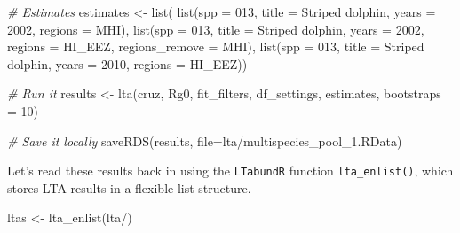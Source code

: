 \documentclass[
]{book}
\newenvironment{Shaded}{\begin{snugshade}}{\end{snugshade}}
\newcommand{\AttributeTok}[1]{\textcolor[rgb]{0.77,0.63,0.00}{#1}}
\newcommand{\CommentTok}[1]{\textcolor[rgb]{0.56,0.35,0.01}{\textit{#1}}}
\newcommand{\DecValTok}[1]{\textcolor[rgb]{0.00,0.00,0.81}{#1}}
\newcommand{\FunctionTok}[1]{\textcolor[rgb]{0.00,0.00,0.00}{#1}}
\newcommand{\NormalTok}[1]{#1}
\newcommand{\OtherTok}[1]{\textcolor[rgb]{0.56,0.35,0.01}{#1}}
\newcommand{\StringTok}[1]{\textcolor[rgb]{0.31,0.60,0.02}{#1}}
\begin{document}
\begin{Shaded}
\begin{Highlighting}[]
\CommentTok{\# Estimates}
\NormalTok{estimates }\OtherTok{\textless{}{-}} \FunctionTok{list}\NormalTok{(}
    \FunctionTok{list}\NormalTok{(}\AttributeTok{spp =} \StringTok{\textquotesingle{}013\textquotesingle{}}\NormalTok{,}
         \AttributeTok{title =} \StringTok{\textquotesingle{}Striped dolphin\textquotesingle{}}\NormalTok{,}
         \AttributeTok{years =} \DecValTok{2002}\NormalTok{,}
         \AttributeTok{regions =} \StringTok{\textquotesingle{}MHI\textquotesingle{}}\NormalTok{),}
    \FunctionTok{list}\NormalTok{(}\AttributeTok{spp =} \StringTok{\textquotesingle{}013\textquotesingle{}}\NormalTok{,}
         \AttributeTok{title =} \StringTok{\textquotesingle{}Striped dolphin\textquotesingle{}}\NormalTok{,}
         \AttributeTok{years =} \DecValTok{2002}\NormalTok{,}
         \AttributeTok{regions =} \StringTok{\textquotesingle{}HI\_EEZ\textquotesingle{}}\NormalTok{,}
         \AttributeTok{regions\_remove =} \StringTok{\textquotesingle{}MHI\textquotesingle{}}\NormalTok{),}
    \FunctionTok{list}\NormalTok{(}\AttributeTok{spp =} \StringTok{\textquotesingle{}013\textquotesingle{}}\NormalTok{,}
         \AttributeTok{title =} \StringTok{\textquotesingle{}Striped dolphin\textquotesingle{}}\NormalTok{,}
         \AttributeTok{years =} \DecValTok{2010}\NormalTok{,}
         \AttributeTok{regions =} \StringTok{\textquotesingle{}HI\_EEZ\textquotesingle{}}\NormalTok{))}

\CommentTok{\# Run it}
\NormalTok{results }\OtherTok{\textless{}{-}} \FunctionTok{lta}\NormalTok{(cruz, Rg0, }
\NormalTok{               fit\_filters, df\_settings, estimates, }
               \AttributeTok{bootstraps =} \DecValTok{10}\NormalTok{)}

\CommentTok{\# Save it locally}
\FunctionTok{saveRDS}\NormalTok{(results, }\AttributeTok{file=}\StringTok{\textquotesingle{}lta/multispecies\_pool\_1.RData\textquotesingle{}}\NormalTok{)}
\end{Highlighting}
\end{Shaded}

Let's read these results back in using the \texttt{LTabundR} function \texttt{lta\_enlist()}, which stores LTA results in a flexible list structure.

\begin{Shaded}
\begin{Highlighting}[]
\NormalTok{ltas }\OtherTok{\textless{}{-}} \FunctionTok{lta\_enlist}\NormalTok{(}\StringTok{\textquotesingle{}lta/\textquotesingle{}}\NormalTok{)}
\end{Highlighting}
\end{Shaded}
\end{document}
